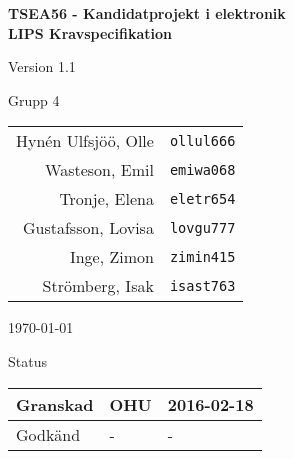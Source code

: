 \documentclass[11pt]{article}
\begin{document}
\begin{titlepage}
\begin{center}

{\Large\bfseries TSEA56 - Kandidatprojekt i elektronik \\ LIPS Kravspecifikation}

\vspace{5em}

Version 1.1

\vspace{5em}
%
Grupp 4 \\
\begin{tabular}{rl}
Hynén Ulfsjöö, Olle&\verb+ollul666+
\\
Wasteson, Emil&\verb+emiwa068+
\\
Tronje, Elena&\verb+eletr654+
\\
Gustafsson, Lovisa&\verb+lovgu777+
\\
Inge, Zimon&\verb+zimin415+
\\
Strömberg, Isak&\verb+isast763+
\\
\end{tabular}

\vspace{5em}
\today

\vspace{18em}
Status
\begin{longtable}{|l|l|l|} \hline

Granskad & OHU & 2016-02-18 \\ \hline
Godkänd & - & - \\ \hline
 
\end{longtable}

\end{center}
\end{titlepage}
\end{document}
